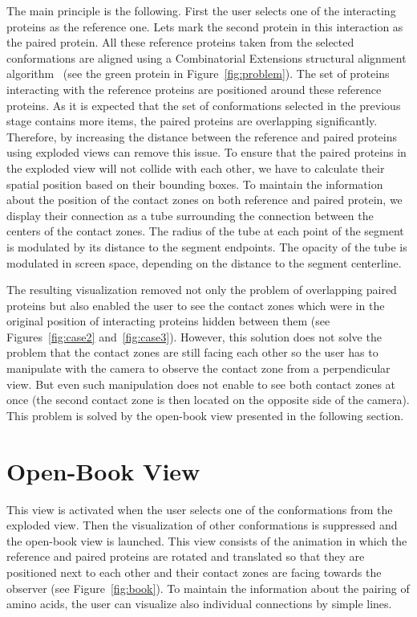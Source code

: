 \documentclass[journal]{vgtc}                %
\begin{document}
The main principle is the following.
First the user selects one of the interacting proteins as the reference one.
Lets mark the second protein in this interaction as the paired protein.
All these reference proteins taken from the selected conformations are aligned using a Combinatorial Extensions structural alignment algorithm~\cite{Shindyalov1998} (see the green protein in Figure~\ref{fig:problem}).
The set of proteins interacting with the reference proteins are positioned around these reference proteins.
As it is expected that the set of conformations selected in the previous stage contains more items, the paired proteins are overlapping significantly.
Therefore, by increasing the distance between the reference and paired proteins using exploded views can remove this issue.
To ensure that the paired proteins in the exploded view will not collide with each other, we have to calculate their spatial position based on their bounding boxes.
To maintain the information about the position of the contact zones on both reference and paired protein, we display their connection as a tube surrounding the connection between the centers of the contact zones.
The radius of the tube at each point of the segment is modulated by its distance to the segment endpoints.
The opacity of the tube is modulated in screen space, depending on the distance to the segment centerline.

The resulting visualization removed not only the problem of overlapping paired proteins but also enabled the user to see the contact zones which were in the original position of interacting proteins hidden between them (see Figures~\ref{fig:case2} and~\ref{fig:case3}).
However, this solution does not solve the problem that the contact zones are still facing each other so the user has to manipulate with the camera to observe the contact zone from a perpendicular view. 
But even such manipulation does not enable to see both contact zones at once (the second contact zone is then located on the opposite side of the camera).
This problem is solved by the open-book view presented in the following section.

\section{Open-Book View}
This view is activated when the user selects one of the conformations from the exploded view. 
Then the visualization of other conformations is suppressed and the open-book view is launched.
This view consists of the animation in which the reference and paired proteins are rotated and translated so that they are positioned next to each other and their contact zones are facing towards the observer (see Figure~\ref{fig:book}). 
To maintain the information about the pairing of amino acids, the user can visualize also individual connections by simple lines.
\end{document}
